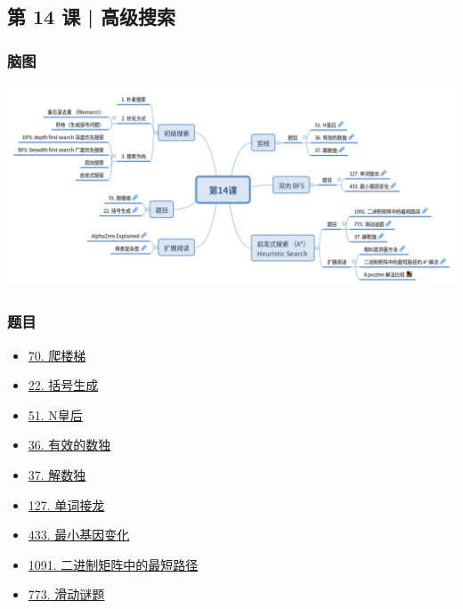 \subsection{第 14 课 | 高级搜索}

\subsubsection{脑图}

\includegraphics[width=140mm,height=60mm]{images/camp/第14课.png}

\subsubsection{题目}

\begin{itemize}
  \item \hyperref[leetcode:70]{70. 爬楼梯}
  \item \hyperref[leetcode:22]{22. 括号生成}
  \item \hyperref[leetcode:51]{51. N皇后}
  \item \hyperref[leetcode:36]{36. 有效的数独}
  \item \hyperref[leetcode:37]{37. 解数独}
  \item \hyperref[leetcode:127]{127. 单词接龙}
  \item \hyperref[leetcode:433]{433. 最小基因变化}
  \item \hyperref[leetcode:1091]{1091. 二进制矩阵中的最短路径}
  \item \hyperref[leetcode:773]{773. 滑动谜题}
\end{itemize}
